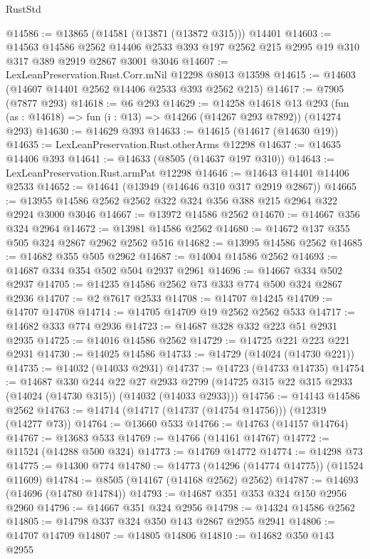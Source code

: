 \begin{lexlean}{RustStd}
\begin{coremodule}
@14586 := @13865 (@14581 (@13871 (@13872 @315))) @14401
@14603 := @14563
    @14586
    @2562
    @14406
    @2533
    @393
    @197
    @2562
    @215
    @2995
    @19
    @310
    @317
    @389
    @2919
    @2867
    @3001
    @3046
@14607 := LexLeanPreservation.Rust.Corr.mNil @12298 @8013 @13598
@14615 := @14603 (@14607 @14401 @2562 @14406 @2533 @393 @2562 @215)
@14617 := @7905 (@7877 @293)
@14618 := @6 @293
@14629 := @14258
    @14618
    @13
    @293
    (fun (as : @14618) => fun (i : @13) => @14266 (@14267 @293 @7892))
    (@14274 @293)
@14630 := @14629 @393
@14633 := @14615 (@14617 (@14630 @19))
@14635 := LexLeanPreservation.Rust.otherArms @12298
@14637 := @14635 @14406 @393
@14641 := @14633 (@8505 (@14637 @197 @310))
@14643 := LexLeanPreservation.Rust.armPat @12298
@14646 := @14643 @14401 @14406 @2533
@14652 := @14641 (@13949 (@14646 @310 @317 @2919 @2867))
@14665 := @13955 @14586 @2562 @2562 @322 @324 @356 @388 @215 @2964 @322 @2924 @3000 @3046
@14667 := @13972 @14586 @2562
@14670 := @14667 @356 @324 @2964
@14672 := @13981 @14586 @2562
@14680 := @14672 @137 @355 @505 @324 @2867 @2962 @2562 @516
@14682 := @13995 @14586 @2562
@14685 := @14682 @355 @505 @2962
@14687 := @14004 @14586 @2562
@14693 := @14687 @334 @354 @502 @504 @2937 @2961
@14696 := @14667 @334 @502 @2937
@14705 := @14235 @14586 @2562 @73 @333 @774 @500 @324 @2867 @2936
@14707 := @2 @7617 @2533
@14708 := @14707 @14245
@14709 := @14707 @14708
@14714 := @14705 @14709 @19 @2562 @2562 @533
@14717 := @14682 @333 @774 @2936
@14723 := @14687 @328 @332 @223 @51 @2931 @2935
@14725 := @14016 @14586 @2562
@14729 := @14725 @221 @223 @221 @2931
@14730 := @14025 @14586
@14733 := @14729 (@14024 (@14730 @221))
@14735 := @14032 (@14033 @2931)
@14737 := @14723 (@14733 @14735)
@14754 := @14687
    @330
    @244
    @22
    @27
    @2933
    @2799
    (@14725 @315 @22 @315 @2933 (@14024 (@14730 @315)) (@14032 (@14033 @2933)))
@14756 := @14143 @14586 @2562
@14763 := @14714 (@14717 (@14737 (@14754 @14756))) (@12319 (@14277 @73))
@14764 := @13660 @533
@14766 := @14763 (@14157 @14764)
@14767 := @13683 @533
@14769 := @14766 (@14161 @14767)
@14772 := @11524 (@14288 @500 @324)
@14773 := @14769 @14772
@14774 := @14298 @73
@14775 := @14300 @774
@14780 := @14773 (@14296 (@14774 @14775)) (@11524 @11609)
@14784 := @8505 (@14167 (@14168 @2562) @2562)
@14787 := @14693 (@14696 (@14780 @14784))
@14793 := @14687 @351 @353 @324 @150 @2956 @2960
@14796 := @14667 @351 @324 @2956
@14798 := @14324 @14586 @2562
@14805 := @14798 @337 @324 @350 @143 @2867 @2955 @2941
@14806 := @14707 @14709
@14807 := @14805 @14806
@14810 := @14682 @350 @143 @2955

\end{coremodule}
\end{lexlean}
